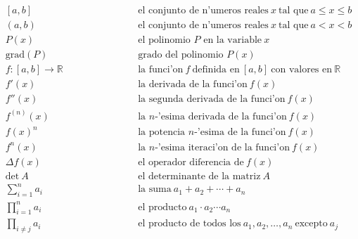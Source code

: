 $$\begin{array}{lcl}
\left[ a,b \right] & \hspace{1in} & \mbox{el conjunto de n'umeros reales} \ x \
\mbox{tal que} \ a \leq x \leq b\\
(a,b) & \hspace{1in} & \mbox{el conjunto de n'umeros reales} \ x \ 
\mbox{tal que} \ a < x < b\\
P(x) & \hspace{1in} & \mbox{el polinomio $P$ en la variable}\ x \\
\text{grad} (P) & \hspace{1in} & \mbox{grado del polinomio $P(x)$} \\
f:\left[a, b\right] \to \mathbb{R} & \hspace{1in} & \mbox{la funci'on} \ f \ 
\mbox{definida en} \
\left[a,b\right] \ \mbox{con valores en} \ \mathbb{R}\\
f'(x) & \hspace{1in} & \mbox{la derivada de la funci'on} \ f(x)\\
f''(x) & \hspace{1in} & \mbox{la segunda derivada de la funci'on} \ f(x)\\
f^{(n)}(x) & \hspace{1in} & \mbox{la $n$-'esima derivada de la funci'on} \ f(x)\\
f(x)^n & \hspace{1in} & \mbox{la potencia $n$-'esima de la funci'on} \ f(x)\\
f^n(x) & \hspace{1in} & \mbox{la $n$-'esima iteraci'on de la funci'on} \ f(x)\\
\Delta f(x) & \hspace{1in} & \mbox{el operador diferencia de} \ f(x)\\
\mbox{det} \ A & \hspace{1in} & \mbox{el determinante de la matriz} \ A\\
\sum_{i=1}^n a_i & \hspace{1in} & \mbox{la suma} \ a_1+a_2+\cdots+a_n\\
\prod_{i=1}^n a_i & \hspace{1in} & \mbox{el producto} \ a_1 \cdot a_2 \cdots a_n\\
\prod_{i\neq j} a_i & \hspace{1in} & \mbox{el producto de todos los} \ a_1, a_2, \dots, a_n \ \mbox{excepto} \ a_j\\
\end{array}
$$

